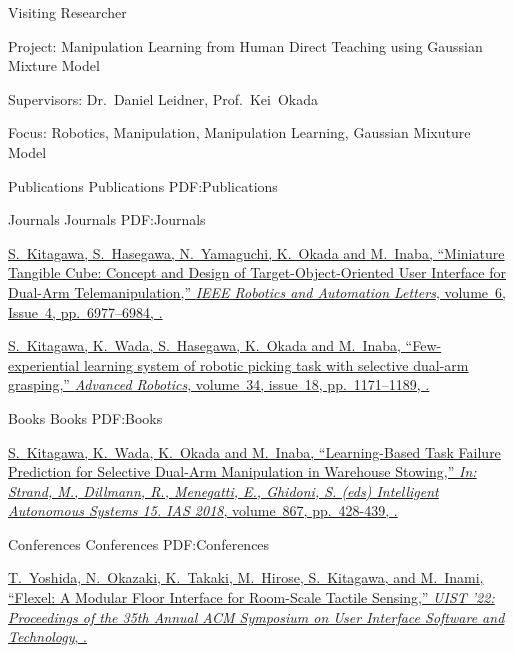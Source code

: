\documentclass[letterpaper,MMMyyyy,nonstopmode]{simpleresumecv}
\begin{document}
\begin{Body}
\Gap
Visiting Researcher
\hfill
{}
\begin{Detail}
\par
Project:
Manipulation Learning from Human Direct Teaching using Gaussian Mixture Model
\par
Supervisors:
Dr.~Daniel Leidner,
Prof.~Kei~Okada
\par
Focus:
Robotics, Manipulation, Manipulation Learning, Gaussian Mixuture Model
\end{Detail}
\Gap


\Section
{Publications}
{Publications}
{PDF:Publications}

\SubSection
{Journals}
{Journals}
{PDF:Journals}

\begingroup

\BulletItem
\href{https://doi.org/10.1109/LRA.2021.3096475}
{\underline{S.~Kitagawa}, S.~Hasegawa, N.~Yamaguchi, K.~Okada and M.~Inaba,
``Miniature Tangible Cube: Concept and Design of Target-Object-Oriented User Interface for Dual-Arm Telemanipulation,''
\textit{IEEE Robotics and Automation Letters},
volume~6,
Issue~4,
pp.~6977--6984,
.}

\Gap
\BulletItem
\href{https://doi.org/10.1080/01691864.2020.1783352}
{\underline{S.~Kitagawa}, K.~Wada, S.~Hasegawa, K.~Okada and M.~Inaba,
``Few-experiential learning system of robotic picking task with selective dual-arm grasping,''
\textit{Advanced Robotics},
volume~34,
issue~18,
pp.~1171--1189,
.}

\endgroup

\BigGap
\SubSection
{Books}
{Books}
{PDF:Books}

\begingroup

\BulletItem
\href{https://doi.org/10.1007/978-3-030-01370-7_34}
{\underline{S.~Kitagawa}, K.~Wada, K.~Okada and M.~Inaba,
``Learning-Based Task Failure Prediction for Selective Dual-Arm Manipulation in Warehouse Stowing,''
\textit{In: Strand, M., Dillmann, R., Menegatti, E., Ghidoni, S. (eds) Intelligent Autonomous Systems 15. IAS 2018},
volume~867,
pp.~428-439,
.}

\endgroup

\BigGap
\SubSection
{Conferences}
{Conferences}
{PDF:Conferences}

\begingroup

\BulletItem
\href{https://doi.org/10.1145/3526113.3545699}
{T.~Yoshida, N.~Okazaki, K.~Takaki, M.~Hirose, \underline{S.~Kitagawa}, and M.~Inami,
``Flexel: A Modular Floor Interface for Room-Scale Tactile Sensing,''
\textit{UIST '22: Proceedings of the 35th Annual ACM Symposium on User Interface Software and Technology},
.}


\end{Body}
\end{document}

